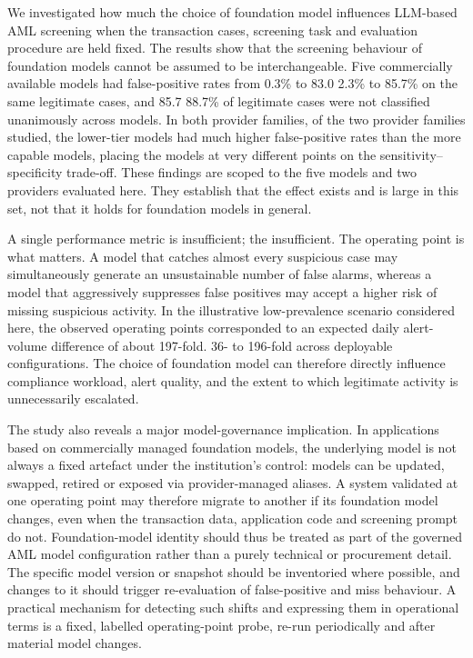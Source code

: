\documentclass[pdflatex,sn-basic,Numbered]{sn-jnl}
\newcommand{\HLtext}[1]{\texthl{#1}}
\newcommand{\HLdel}[1]{\textcolor{HLink}{\sout{#1}}}
\renewcommand{\HLtext}[1]{#1}\renewcommand{\HLdel}[1]{#1}%
\begin{document}
We investigated how much the choice of foundation model influences LLM-based AML screening when the transaction cases, screening task and evaluation procedure are held fixed. The results show that the screening behaviour of foundation models cannot be assumed to be interchangeable. Five commercially available models had false-positive rates from \HLdel{0.3\% to 83.0} \HLtext{2.3}\% \HLtext{to 85.7}\% on the same legitimate cases, and \HLdel{85.7} \HLtext{88.7}\% of legitimate cases were not classified unanimously across models. In both \HLdel{provider families,} \HLtext{of the two provider families studied,} the lower-tier models had much higher false-positive rates than the more capable models, placing the models at very different points on the sensitivity--specificity trade-off. \HLtext{These findings are scoped to the five models and two providers evaluated here. They establish that the effect exists and is large in this set, not that it holds for foundation models in general.}

A single performance metric is \HLdel{insufficient; the} \HLtext{insufficient. The} operating point is what matters. A model that catches almost every suspicious case may simultaneously generate an unsustainable number of false alarms, whereas a model that aggressively suppresses false positives may accept a higher risk of missing suspicious activity. In the illustrative low-prevalence scenario considered here, the observed operating points corresponded to an expected daily alert-volume difference of \HLdel{about 197-fold.} \HLtext{36- to 196-fold across deployable configurations.} The choice of foundation model can therefore directly influence compliance workload, alert quality, and the extent to which legitimate activity is unnecessarily escalated.

The study also reveals a major model-governance implication. In applications based on commercially managed foundation models, the underlying model is not always a fixed artefact under the institution's control: models can be updated, swapped, retired or exposed via provider-managed aliases. A system validated at one operating point may therefore migrate to another if its foundation model changes, even when the transaction data, application code and screening prompt do not. Foundation-model identity should thus be treated as part of the governed AML model configuration rather than a purely technical or procurement detail. The specific model version or snapshot should be inventoried where possible, and changes to it should trigger re-evaluation of false-positive and miss behaviour. A practical mechanism for detecting such shifts and expressing them in operational terms is a fixed, labelled operating-point probe, re-run periodically and after material model changes.
\end{document}
